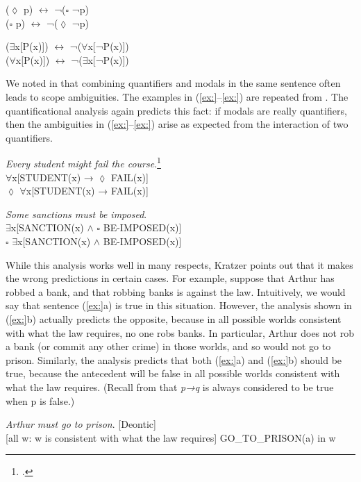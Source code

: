 \ea
\ea   (${\lozenge}$ p)  $\leftrightarrow $  ¬(${\square}$ ¬p)\\
\ex   (${\square}$ p)  $\leftrightarrow $  ¬(${\lozenge}$ ¬p)
                       \z
\z

\ea
\ea   (${\exists}$x[P(x)])  $\leftrightarrow $  ¬(${\forall}$x[¬P(x)])\\
\ex   (${\forall}$x[P(x)])  $\leftrightarrow $  ¬(${\exists}$x[¬P(x)])
                       \z
\z


We noted in  that combining quantifiers and modals in the same sentence often leads to scope ambiguities. The examples in (\ref{ex:}--\ref{ex:}) are repeated from . The quantificational analysis again predicts this fact: if modals are really quantifiers, then the ambiguities in (\ref{ex:}--\ref{ex:}) arise as expected from the interaction of two quantifiers.


\ea
\textit{Every student might fail the course}.\footnote{\citet[48]{Abbott2010}.}\\
\ea ${\forall}$x[STUDENT(x) → ${\lozenge}$ FAIL(x)]\\
\ex ${\lozenge}$ ${\forall}$x[STUDENT(x) → FAIL(x)]
                       \z
\z

\ea
\textit{Some sanctions must be imposed}.\\
\ea ${\exists}$x[SANCTION(x) $\wedge$ ${\square}$ BE-IMPOSED(x)]\\
\ex ${\square}$ ${\exists}$x[SANCTION(x) $\wedge$ BE-IMPOSED(x)]
                       \z
\z


While this analysis works well in many respects, Kratzer points out that it makes the wrong predictions in certain cases. For example, suppose that Arthur has robbed a bank, and that robbing banks is against the law. Intuitively, we would say that sentence (\ref{ex:}a) is true in this situation. However, the analysis shown in (\ref{ex:}b) actually predicts the opposite, because in all possible worlds consistent with what the law requires, no one robs banks. In particular, Arthur does not rob a bank (or commit any other crime) in those worlds, and so would not go to prison. Similarly, the analysis predicts that both (\ref{ex:}a) and (\ref{ex:}b) should be true, because the antecedent will be false in all possible worlds consistent with what the law requires. (Recall from  that \textit{p→q} is always considered to be true when p is false.)


\ea
\ea \textit{Arthur must go to prison}.  [Deontic]\\
\ex{} [all w: w is consistent with what the law requires] GO\_TO\_PRISON(a) in w
                       \z
\z

